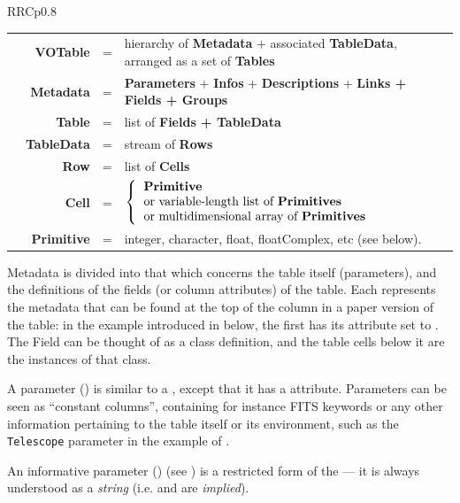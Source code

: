\medskip
\ifhtx\begin{tabular}{RRCp{0.8\textwidth}}
\else\begin{tabular}{rrcp{}}\fi
\hspace{3em}&{\bf VOTable} &=& hierarchy of {\bf Metadata} + associated
        {\bf TableData}, arranged as a set of {\bf Tables}\\
&{\bf Metadata} &=& {\bf Parameters} + {\bf Infos} + {\bf Descriptions}
                + {\bf {\fg{black}Links + Fields + Groups}}\\
&{\bf Table} &=& list of {\bf Fields + TableData}\\
&{\bf TableData}{ } &=& stream of {\bf Rows}\\
&{\bf Row} &=& list of {\bf Cells}\\
&{\bf Cell} &=& 
        $\left\{
        \begin{tabular}{l}
         {\bf Primitive} \\
        or variable-length list of {\bf Primitives} \\
        or multidimensional array of {\bf Primitives}\\
        \end{tabular}
        \right.$
        \\
&{\bf Primitive} &=& integer, character, float, floatComplex, etc
(see \Tref{primitives}{table of primitives} below).
\end{tabular}

\medskip
\par\noindent
Metadata is divided into that which concerns the table itself 
(parameters), and the definitions of the fields (or column
attributes) of the table. 
Each  represents the metadata 
that can be found at the
top of the column in a paper version of the table: 
in the example introduced in  below, the first  has its  attribute
set to . The Field can be thought of as a class definition,
and the table cells below it are the instances of that class.

A parameter ({})
is similar to a {},
except that it has a  attribute.
Parameters can be seen as ``constant columns'', containing for instance
FITS keywords or any other
information pertaining to the table itself or its environment, such as the
{\tt Telescope} parameter in the example of .

An informative parameter ({}) (see )
is a restricted form of the {} ---  it is always understood
as a {\em string} (i.e. 
and  are {\em implied}).


\end{tabular}
